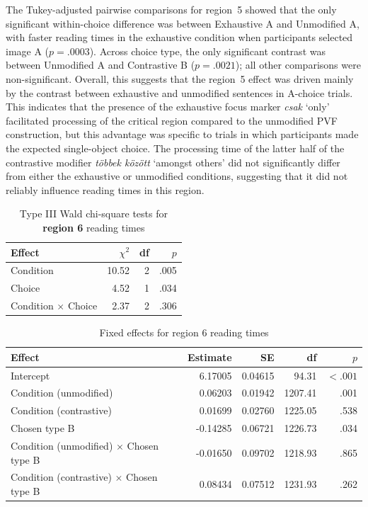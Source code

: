 \documentclass[ruler]{CUP-JNL-LIN}%
\begin{document}
The Tukey-adjusted pairwise comparisons for region~5 showed that the only significant within-choice difference was between Exhaustive A and Unmodified A, with faster reading times in the exhaustive condition when participants selected image A ($p=.0003$). Across choice type, the only significant contrast was between Unmodified A and Contrastive B ($p=.0021$); all other comparisons were non-significant. Overall, this suggests that the region~5 effect was driven mainly by the contrast between exhaustive and unmodified sentences in A-choice trials. This indicates that the presence of the exhaustive focus marker \textit{csak} `only' facilitated processing of the critical region compared to the unmodified PVF construction, but this advantage was specific to trials in which participants made the expected single-object choice. The processing time of the latter half of the contrastive modifier \textit{többek között} `amongst others' did not significantly differ from either the exhaustive or unmodified conditions, suggesting that it did not reliably influence reading times in this region. 


\begin{table}[htbp]
\centering
\caption{Type III Wald chi-square tests for \textbf{region 6} reading times}
\label{tab:r6}
\begin{tabularx}{\textwidth}{@{}Xrrr@{}}
\toprule
Effect & $\chi^2$ & df & $p$ \\
\midrule
Condition & 10.52 & 2 & .005 \\
Choice & 4.52 & 1 & .034 \\
Condition $\times$ Choice & 2.37 & 2 & .306 \\
\bottomrule
\end{tabularx}
\end{table}

\begin{table}[htbp]
\centering
\caption{Fixed effects for region 6 reading times}
\label{tab:r6-fixed}
\begin{tabularx}{\textwidth}{@{}Xrrrr@{}}
\toprule
Effect & Estimate & SE & df & $p$ \\
\midrule
Intercept & 6.17005 & 0.04615 & 94.31 & $< .001$ \\
Condition (unmodified) & 0.06203 & 0.01942 & 1207.41 & .001 \\
Condition (contrastive) & 0.01699 & 0.02760 & 1225.05 & .538 \\
Chosen type B & -0.14285 & 0.06721 & 1226.73 & .034 \\
Condition (unmodified) $\times$ Chosen type B & -0.01650 & 0.09702 & 1218.93 & .865 \\
Condition (contrastive) $\times$ Chosen type B & 0.08434 & 0.07512 & 1231.93 & .262 \\
\bottomrule
\end{tabularx}
\end{table}
\end{document}
